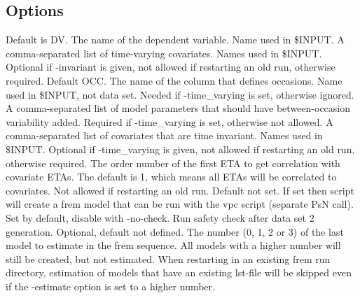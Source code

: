 \subsection{Options}
\begin{optionlist}
Default is DV. The name of the dependent variable. Name used in \$INPUT. 
\nextopt
{}
A comma-separated list of time-varying covariates. Names used in \$INPUT. Optional if -invariant is given, not allowed if restarting an old run, otherwise required. 
\nextopt
{}
Default OCC. The name of the column that defines occasions. Name used in \$INPUT, not data set. Needed if -time\_varying is set, otherwise ignored.   
\nextopt
{}
A comma-separated list of model parameters that should have between-occasion variability added. 
Required if -time\_varying is set, otherwise not allowed. 
\nextopt
{}
A comma-separated list of covariates that are time invariant. Names used in \$INPUT. Optional if -time\_varying is given, not allowed if restarting an old run, otherwise required. 
\nextopt
{}
The order number of the first ETA to get correlation with covariate ETAs. The default is 1, which means all ETAs will be correlated to 
covariates. Not allowed if restarting an old run.
\nextopt
{}
Default not set. If set then script will create a frem model that can be run with the vpc script (separate PsN call).  
\nextopt
{}
Set by default, disable with -no-check. Run safety check after data set 2 generation. 
\nextopt
{}
Optional, default not defined. The number (0, 1, 2 or 3) of the last model to estimate in the frem sequence. All models with a higher number will still be created, but not estimated. When restarting in an existing frem run directory, estimation of models that have an existing lst-file will be skipped even if the -estimate option is set to a higher number.
\nextopt
\end{optionlist}

